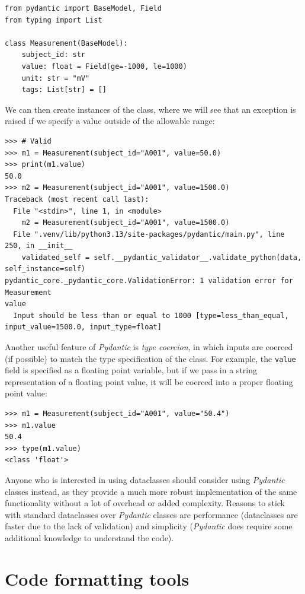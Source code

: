 \begin{lstlisting}[style=Python]
from pydantic import BaseModel, Field
from typing import List

class Measurement(BaseModel):
    subject_id: str
    value: float = Field(ge=-1000, le=1000)
    unit: str = "mV"
    tags: List[str] = []
\end{lstlisting}

We can then create instances of the class, where we will see that an exception is raised if we specify a value outside of the allowable range:

\begin{lstlisting}[style=repl]
>>> # Valid
>>> m1 = Measurement(subject_id="A001", value=50.0)
>>> print(m1.value)
50.0
>>> m2 = Measurement(subject_id="A001", value=1500.0)
Traceback (most recent call last):
  File "<stdin>", line 1, in <module>
    m2 = Measurement(subject_id="A001", value=1500.0)
  File ".venv/lib/python3.13/site-packages/pydantic/main.py", line 250, in __init__
    validated_self = self.__pydantic_validator__.validate_python(data, self_instance=self)
pydantic_core._pydantic_core.ValidationError: 1 validation error for Measurement
value
  Input should be less than or equal to 1000 [type=less_than_equal, input_value=1500.0, input_type=float]
\end{lstlisting}

Another useful feature of \textit{Pydantic} is \textit{type coercion}, in which inputs are coerced (if possible) to match the type specification of the class.  For example, the \texttt{value} field is specified as a floating point variable, but if we pass in a string representation of a floating point value, it will be coerced into a proper floating point value:

\begin{lstlisting}[style=repl]
>>> m1 = Measurement(subject_id="A001", value="50.4")
>>> m1.value
50.4
>>> type(m1.value)
<class 'float'>
\end{lstlisting}

Anyone who is interested in using dataclasses should consider using \textit{Pydantic} classes instead, as they provide a much more robust implementation of the same functionality without a lot of overhead or added complexity.  Reasons to stick with standard dataclasses over \textit{Pydantic} classes are performance (dataclasses are faster due to the lack of validation) and simplicity (\textit{Pydantic} does require some additional knowledge to understand the code).


\section{Code formatting tools}

